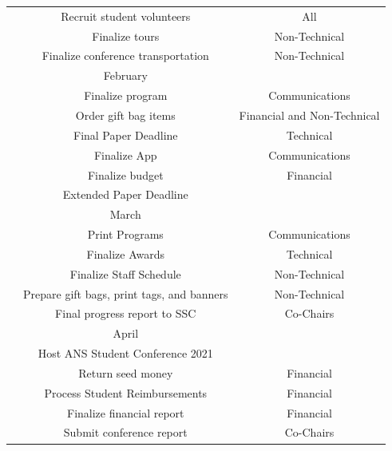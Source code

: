 \begin{center}
\begin{longtable}{c |  c  c}
& Recruit student volunteers& All\\
& Finalize tours& Non-Technical\\
& Finalize conference transportation& Non-Technical\\
\hline\hline
&February&\\
\hline\hline
& Finalize program& Communications\\
& Order gift bag items & Financial and Non-Technical\\
& Final Paper Deadline& Technical\\
& Finalize App& Communications\\
& Finalize budget& Financial\\
& Extended Paper Deadline& \\
\hline\hline
&March&\\
\hline\hline
& Print Programs& Communications\\
& Finalize Awards& Technical\\
& Finalize Staff Schedule& Non-Technical\\
& Prepare gift bags, print tags, and banners& Non-Technical\\
& Final progress report to SSC& Co-Chairs\\
\hline\hline
&April&\\
\hline\hline
& Host ANS Student Conference 2021 & \\
& Return seed money& Financial\\
& Process Student Reimbursements& Financial\\
& Finalize financial report& Financial\\
& Submit conference report& Co-Chairs\\
\hline\hline
\end{longtable}
\end{center}
